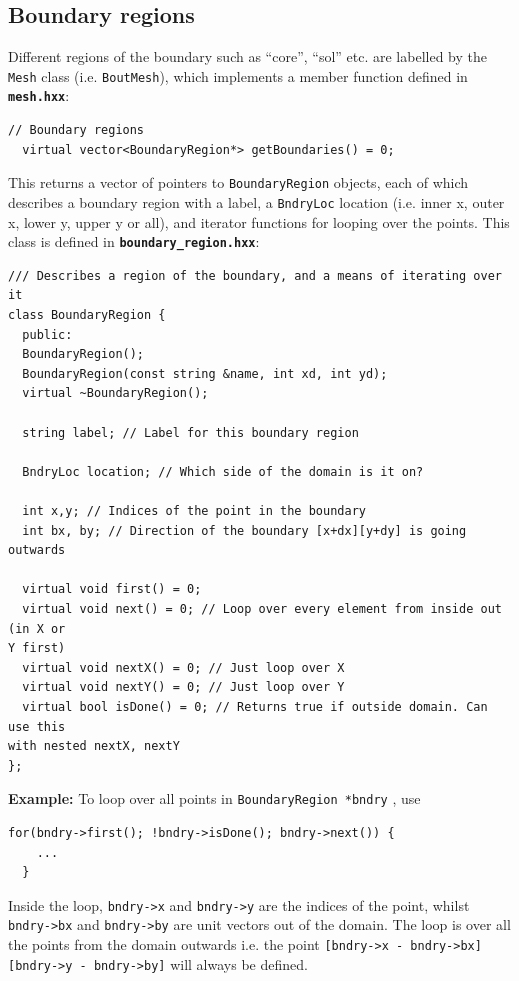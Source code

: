 \documentclass[12pt]{article}
\newcommand{\code}[1]{\texttt{#1}}
\newcommand{\file}[1]{\texttt{\bf #1}}
\begin{document}
\subsection{Boundary regions}
%
\label{sec:BoundaryRegion}
%
Different regions of the boundary such as ``core'', ``sol'' etc. are labelled
by the \code{Mesh} class (i.e. \code{BoutMesh}), which implements a member
function defined in \file{mesh.hxx}:
%
\begin{lstlisting}[firstnumber=150]
  // Boundary regions
  virtual vector<BoundaryRegion*> getBoundaries() = 0;
\end{lstlisting}
%
This returns a vector of pointers to \code{BoundaryRegion} objects, each of
which describes a boundary region with a label, a \code{BndryLoc} location
(i.e. inner x, outer x, lower y, upper y or all), and iterator functions for
looping over the points. This class is defined in \file{boundary\_region.hxx}:
%
%
\begin{lstlisting}[firstnumber=12]
/// Describes a region of the boundary, and a means of iterating over it
class BoundaryRegion {
  public:
  BoundaryRegion();
  BoundaryRegion(const string &name, int xd, int yd);
  virtual ~BoundaryRegion();

  string label; // Label for this boundary region

  BndryLoc location; // Which side of the domain is it on?

  int x,y; // Indices of the point in the boundary
  int bx, by; // Direction of the boundary [x+dx][y+dy] is going outwards

  virtual void first() = 0;
  virtual void next() = 0; // Loop over every element from inside out (in X or 
Y first)
  virtual void nextX() = 0; // Just loop over X
  virtual void nextY() = 0; // Just loop over Y
  virtual bool isDone() = 0; // Returns true if outside domain. Can use this 
with nested nextX, nextY
};
\end{lstlisting}
%
{\bf Example:} To loop over all points in \code{BoundaryRegion *bndry} , use
%
\begin{lstlisting}[numbers=none]
  for(bndry->first(); !bndry->isDone(); bndry->next()) {
    ...
  }
\end{lstlisting}
%
Inside the loop, \code{bndry->x} and \code{bndry->y} are the indices of the
point, whilst \code{bndry->bx} and \code{bndry->by} are unit vectors out of the
domain. The loop is over all the points from the domain outwards i.e. the point
\code{[bndry->x - bndry->bx][bndry->y - bndry->by]} will always be defined.
\end{document}
